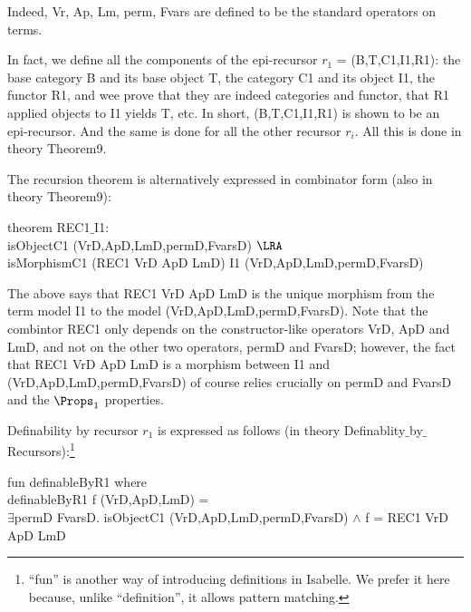 Indeed, \textsf{Vr}, \textsf{Ap}, \textsf{Lm}, \textsf{perm}, \textsf{Fvars} are defined to be the standard operators on terms. 
%

In fact, we define all the components of the epi-recursor $r_1$ = \textsf{(B,T,C1,I1,R1)}: the base category \textsf{B} and its 
base object \textsf{T}, the category \textsf{C1} and its object \textsf{I1}, the functor \textsf{R1}, and wee prove that 
they are indeed categories and functor, that \textsf{R1} applied objects to \textsf{I1} yields \textsf{T}, etc. In short, 
\textsf{(B,T,C1,I1,R1)} is shown to be an epi-recursor. And the same is done for all the other recursor $r_i$. All this is done 
in theory \textsf{Theorem9}. 

The recursion theorem is alternatively expressed in combinator form (also in theory \textsf{Theorem9}): 

\medskip 
\noindent 
\textsf{
theorem REC1$\_$\allowbreak{}I1: 
\\
\hspace*{3ex}isObjectC1 (VrD,ApD,LmD,permD,FvarsD) $\LRA$ 
\\
\hspace*{3ex}isMorphismC1 (REC1 VrD ApD LmD) I1 (VrD,ApD,LmD,permD,FvarsD)
}
\medskip 

The above says that \textsf{REC1 VrD ApD LmD} is the unique morphism from the term model \textsf{I1} to the model \textsf{(VrD,ApD,LmD,permD,FvarsD)}. 
Note that the combintor \textsf{REC1} only depends on the constructor-like operators 
\textsf{VrD}, \textsf{ApD} and \textsf{LmD}, and not on the other two operators, \textsf{permD} and \textsf{FvarsD}; 
however, the fact that \textsf{REC1 VrD ApD LmD} is a morphism between \textsf{I1} and 
\textsf{(VrD,ApD,LmD,permD,FvarsD)} of course relies crucially on \textsf{permD} and \textsf{FvarsD} and the $\Props_1$ properties. 

\medskip 
Definability by recursor $r_1$ is expressed as follows (in theory \textsf{Definablity$\_$\allowbreak{}by$\_$\allowbreak{}Recursors}):\footnote{``\textsf{fun}'' is another way of introducing definitions in Isabelle. We prefer it here because, unlike ``\textsf{definition}'', it allows pattern matching.}  

\medskip 
\noindent 
\textsf{
fun definableByR1 where 
\\\hspace*{3ex}definableByR1 f (VrD,ApD,LmD) = 
\\\hspace*{3ex}$\exists$permD FvarsD. isObjectC1 (VrD,ApD,LmD,permD,FvarsD) $\wedge$ 
f = REC1 VrD ApD LmD
}
\medskip 

